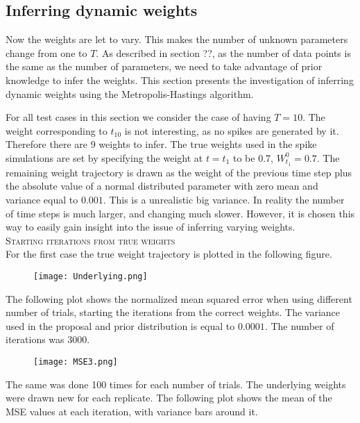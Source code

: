 \subsection{Inferring dynamic weights}
Now the weights are let to vary. This makes the number of unknown parameters change from one to $T$. As described in section ??, as the number of data points is the same as the number of parameters, we need to take advantage of prior knowledge to infer the weights. This section presents the investigation of inferring dynamic weights using the Metropolis-Hastings algorithm.

For all test cases in this section we consider the case of having $T=10$. The weight corresponding to $t_{10}$ is not interesting, as no spikes are generated by it. Therefore there are 9 weights to infer. The true weights used in the spike simulations are set by specifying the weight at $t=t_1$ to be 0.7, $W_{t_1}^0 = 0.7$. The remaining weight trajectory is drawn as the weight of the previous time step plus the absolute value of a normal distributed parameter with zero mean and variance equal to $0.001$. This is a unrealistic big variance. In reality the number of time steps is much larger, and changing much slower. However, it is chosen this way to easily gain insight into the issue of inferring varying weights. \\

\textsc{Starting iterations from true weights}\\
For the first case the true weight trajectory is plotted in the following figure. 


\begin{figure}[hbt!]
    \centering
    \texttt{[image: Underlying.png]}
\end{figure}

The following plot shows the normalized mean squared error when using different number of trials, starting the iterations from the correct weights. The variance used in the proposal and prior distribution is equal to $0.0001$. The number of iterations was 3000.

\begin{figure}[hbt!]
    \centering
    \texttt{[image: MSE3.png]}
\end{figure}

The same was done 100 times for each number of trials. The underlying weights were drawn new for each replicate. The following plot shows the mean of the MSE values at each iteration, with variance bars around it. 

